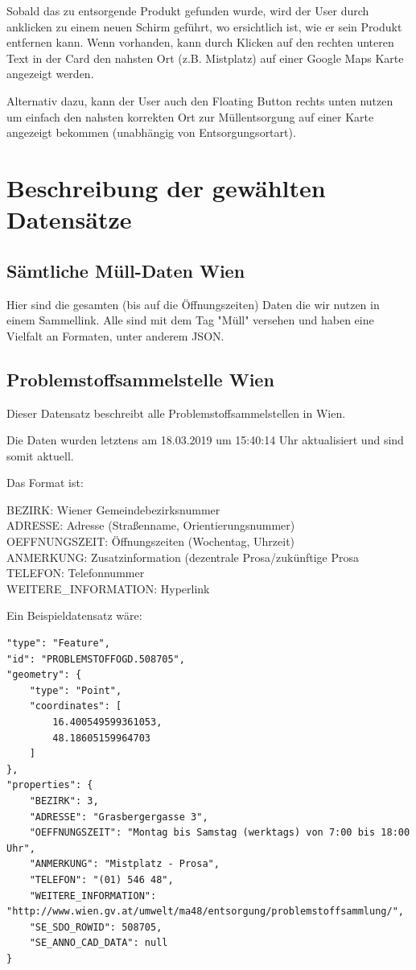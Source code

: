 \documentclass[12pt, a4paper]{scrreprt}
\begin{document}
Sobald das zu entsorgende Produkt gefunden wurde, wird der User durch anklicken zu einem neuen Schirm geführt, wo ersichtlich ist, wie er sein Produkt entfernen kann. Wenn vorhanden, kann durch Klicken auf den rechten unteren Text in der Card den nahsten Ort (z.B. Mistplatz) auf einer Google Maps Karte angezeigt werden.

Alternativ dazu, kann der User auch den Floating Button rechts unten nutzen um einfach den nahsten korrekten Ort zur Müllentsorgung auf einer Karte angezeigt bekommen (unabhängig von Entsorgungsortart).

\section{Beschreibung der gewählten Datensätze}
\subsection{Sämtliche Müll-Daten Wien  \cite{alleMuell}}
    Hier sind die gesamten (bis auf die Öffnungszeiten) Daten die wir nutzen in einem Sammellink. Alle sind mit dem Tag "Müll" versehen und haben eine Vielfalt an Formaten, unter anderem JSON.
\subsection{Problemstoffsammelstelle Wien \cite{problemstoffsammelstellen}}
    Dieser Datensatz beschreibt alle Problemstoffsammelstellen in Wien.

    Die Daten wurden letztens am 18.03.2019 um 15:40:14 Uhr aktualisiert und sind somit aktuell.

    Das Format ist:
    \begin{tcolorbox}
        BEZIRK: Wiener Gemeindebezirksnummer\\
        ADRESSE: Adresse (Straßenname, Orientierungsnummer)\\
        OEFFNUNGSZEIT: Öffnungszeiten (Wochentag, Uhrzeit)\\
        ANMERKUNG: Zusatzinformation (dezentrale Prosa/zukünftige Prosa\\
        TELEFON: Telefonnummer\\
        WEITERE\_INFORMATION: Hyperlink 
    \end{tcolorbox}
    
    Ein Beispieldatensatz wäre:
    \begin{lstlisting}
"type": "Feature",
"id": "PROBLEMSTOFFOGD.508705",
"geometry": {
    "type": "Point",
    "coordinates": [
        16.400549599361053,
        48.18605159964703
    ]
},
"properties": {
    "BEZIRK": 3,
    "ADRESSE": "Grasbergergasse 3",
    "OEFFNUNGSZEIT": "Montag bis Samstag (werktags) von 7:00 bis 18:00 Uhr",
    "ANMERKUNG": "Mistplatz - Prosa",
    "TELEFON": "(01) 546 48",
    "WEITERE_INFORMATION": "http://www.wien.gv.at/umwelt/ma48/entsorgung/problemstoffsammlung/",
    "SE_SDO_ROWID": 508705,
    "SE_ANNO_CAD_DATA": null
}
    \end{lstlisting}
\end{document}

